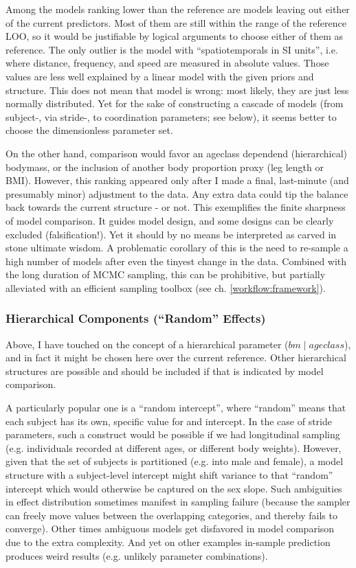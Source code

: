 Among the models ranking lower than the reference are models leaving out either of the current predictors.
Most of them are still within the range of the reference LOO, so it would be justifiable by logical arguments to choose either of them as reference.
The only outlier is the model with ``spatiotemporals in SI units'', i.e. where distance, frequency, and speed are measured in absolute values.
Those values are less well explained by a linear model with the given priors and structure.
This does not mean that model is wrong: most likely, they are just less normally distributed.
Yet for the sake of constructing a cascade of models (from subject-, via stride-, to coordination parameters; see below), it seems better to choose the dimensionless parameter set.


On the other hand, comparison would favor an ageclass dependend (hierarchical) bodymass, or the inclusion of another body proportion proxy (leg length or BMI).
However, this ranking appeared only after I made a final, last-minute (and presumably minor) adjustment to the data.
Any extra data could tip the balance back towards the current structure - or not.
This exemplifies the finite sharpness of model comparison.
It guides model design, and some designs can be clearly excluded (falsification!).
Yet it should by no means be interpreted as carved in stone ultimate wisdom.
A problematic corollary of this is the need to re-sample a high number of models after even the tinyest change in the data.
Combined with the long duration of MCMC sampling, this can be prohibitive, but partially alleviated with an efficient sampling toolbox (see ch. \ref{workflow:framework}).


\subsubsection{Hierarchical Components (``Random'' Effects)}
\label{sec:org86c8327}
Above, I have touched on the concept of a hierarchical parameter (\(bm\mid ageclass\)), and in fact it might be chosen here over the current reference.
Other hierarchical structures are possible and should be included if that is indicated by model comparison.

A particularly popular one is a ``random intercept'', where ``random'' means that each subject has its own, specific value for and intercept.
In the case of stride parameters, such a construct would be possible if we had longitudinal sampling (e.g. individuals recorded at different ages, or different body weights).
However, given that the set of subjects is partitioned (e.g. into male and female), a model structure with a subject-level intercept might shift variance to that ``random'' intercept which would otherwise be captured on the sex slope.
Such ambiguities in effect distribution sometimes manifest in sampling failure (because the sampler can freely move values between the overlapping categories, and thereby fails to converge).
Other times ambiguous models get disfavored in model comparison due to the extra complexity.
And yet on other examples in-sample prediction produces weird results (e.g. unlikely parameter combinations).

